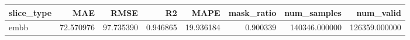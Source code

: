 \begin{tabular}{lrrrrrrr}
\toprule
slice_type & MAE & RMSE & R2 & MAPE & mask_ratio & num_samples & num_valid \\
\midrule
embb & 72.570976 & 97.735390 & 0.946865 & 19.936184 & 0.900339 & 140346.000000 & 126359.000000 \\
\bottomrule
\end{tabular}
